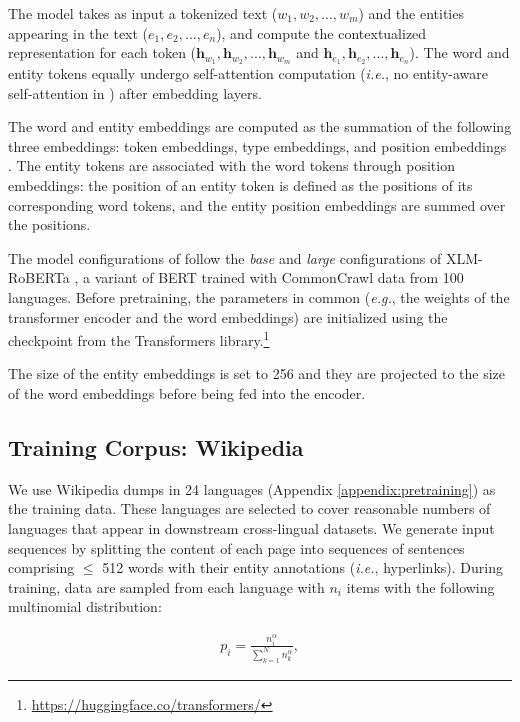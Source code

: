 \documentclass[11pt]{article}
\newcommand{\minisection}[1]{\noindent{\bf {#1}.}}
\newcommand{\Appendix}[1]{Appendix \ref{#1}}
\begin{document}
The model takes as input a tokenized text ($w_1, w_2, ..., w_m$) and the entities appearing in the text ($e_1, e_2, ..., e_n$), and compute the contextualized representation for each token ($\mathbf{h}_{w_1}, \mathbf{h}_{w_2}, ..., \mathbf{h}_{w_m}$ and $\mathbf{h}_{e_1}, \mathbf{h}_{e_2}, ..., \mathbf{h}_{e_n}$).
The word and entity tokens equally undergo self-attention computation ({\it i.e.}, no entity-aware self-attention in \citet{yamada-etal-2020-luke}) after embedding layers.

The word and entity embeddings are computed as the summation of the following three embeddings: token embeddings, type embeddings, and position embeddings \citep{devlin2018bert}.
The entity tokens are associated with the word tokens through position embeddings:
the position of an entity token is defined as the positions of its corresponding word tokens, and the entity position embeddings are summed over the positions.

\minisection{Model Configuration}
The model configurations of \mluke{} follow the {\it base} and {\it large} configurations of XLM-RoBERTa \citep{conneau-etal-2020-unsupervised}, a variant of BERT \citep{devlin2018bert} trained with CommonCrawl data from 100 languages.
Before pretraining, the parameters in common ({\it e.g.}, the weights of the transformer encoder and the word embeddings) are initialized using the checkpoint from the Transformers library.\footnote{\url{https://huggingface.co/transformers/}}

The size of the entity embeddings is set to 256 and they are projected to the size of the word embeddings before being fed into the encoder.

\subsection{Training Corpus: Wikipedia}
We use Wikipedia dumps in 24 languages (\Appendix{appendix:pretraining}) as the training data.
These languages are selected to cover reasonable numbers of languages that appear in downstream cross-lingual datasets.
We generate input sequences by splitting the content of each page into sequences of sentences comprising $\leq$ 512 words with their entity annotations ({\it i.e.}, hyperlinks).
During training, data are sampled from each language with $n_{i}$ items with the following multinomial distribution:

\begin{eqnarray}
  p_{i}=\frac{n_{i}^\alpha}{\sum_{k=1}^{N} n_{k}^\alpha},
\end{eqnarray}
\end{document}
